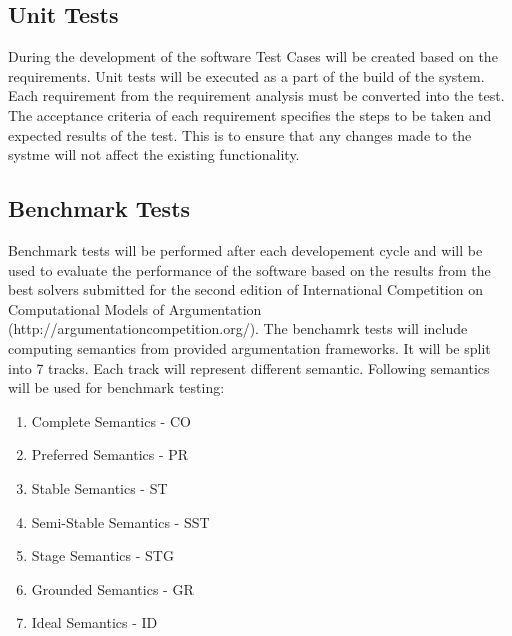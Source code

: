 \subsection{Unit Tests}
During the development of the software Test Cases will be created based on the requirements. Unit tests will be executed as a part of the build of the system. Each requirement from the requirement analysis must be converted into the test. The acceptance criteria of each requirement specifies the steps to be taken and expected results of the test. This is to ensure that any changes made to the systme will not affect the existing functionality. 

\subsection{Benchmark Tests}\label{benchamrkTesting}
Benchmark tests will be performed after each developement cycle and will be used to evaluate the performance of the software based on the results from the best solvers submitted for the second edition of International Competition on Computational Models of Argumentation (http://argumentationcompetition.org/). 
The benchamrk tests will include computing semantics from provided argumentation frameworks. It will be split into 7 tracks. Each track will represent different semantic. Following semantics will be used for benchmark testing:
\begin{enumerate}
	\item{Complete Semantics - CO}
	\item{Preferred Semantics - PR}
	\item{Stable Semantics - ST}
	\item{Semi-Stable Semantics - SST}
	\item{Stage Semantics - STG}
	\item{Grounded Semantics - GR}
	\item{Ideal Semantics - ID}
\end{enumerate}

